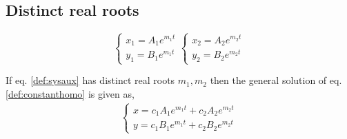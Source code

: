 \documentclass[oneside,11pt,pdftex,final]{book}%
\numberwithin{equation}{section}
\newtheorem{example}[theorem]{Example}
\numberwithin{section}{chapter}
\numberwithin{equation}{chapter}
\begin{document}
%

\subsection{Distinct real roots}
\[ \begin{cases}
	x_1=A_1e^{m_1t}\\
	y_1=B_1e^{m_1t}
\end{cases} \begin{cases}
	x_2=A_2e^{m_2t}\\
	y_2=B_2e^{m_2t}
\end{cases}
\]



If eq. \ref{def:sysaux} has distinct real roots $ m_1, m_2 $ then the general solution of eq. \ref{def:constanthomo} is given as,
\begin{align*}
	\begin{cases}
		x=c_1A_1e^{m_1t}+c_2A_2e^{m_2t}\\
		y=c_1B_1e^{m_1t}+c_2B_2e^{m_2t}
	\end{cases}
\end{align*}
\end{document}

